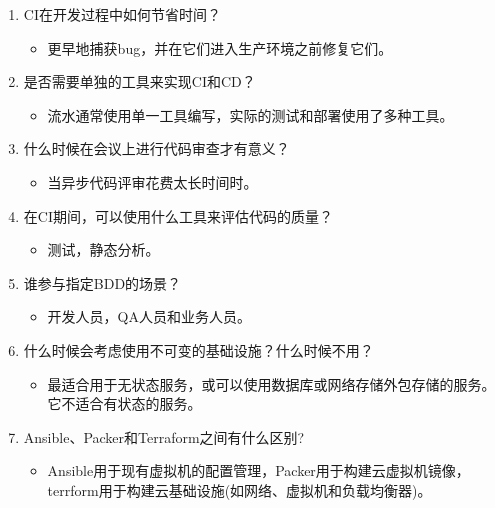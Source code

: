 \begin{enumerate}
\item
CI在开发过程中如何节省时间？
\begin{itemize}
\item 
更早地捕获bug，并在它们进入生产环境之前修复它们。
\end{itemize}

\item
是否需要单独的工具来实现CI和CD？
\begin{itemize}
\item 
流水通常使用单一工具编写，实际的测试和部署使用了多种工具。
\end{itemize}

\item
什么时候在会议上进行代码审查才有意义？
\begin{itemize}
\item 
当异步代码评审花费太长时间时。
\end{itemize}

\item
在CI期间，可以使用什么工具来评估代码的质量？
\begin{itemize}
\item 
测试，静态分析。
\end{itemize}

\item
谁参与指定BDD的场景？
\begin{itemize}
\item 
开发人员，QA人员和业务人员。
\end{itemize}

\item
什么时候会考虑使用不可变的基础设施？什么时候不用？
\begin{itemize}
\item 
最适合用于无状态服务，或可以使用数据库或网络存储外包存储的服务。它不适合有状态的服务。
\end{itemize}

\item
Ansible、Packer和Terraform之间有什么区别?
\begin{itemize}
\item 
Ansible用于现有虚拟机的配置管理，Packer用于构建云虚拟机镜像，terrform用于构建云基础设施(如网络、虚拟机和负载均衡器)。
\end{itemize}
\end{enumerate}